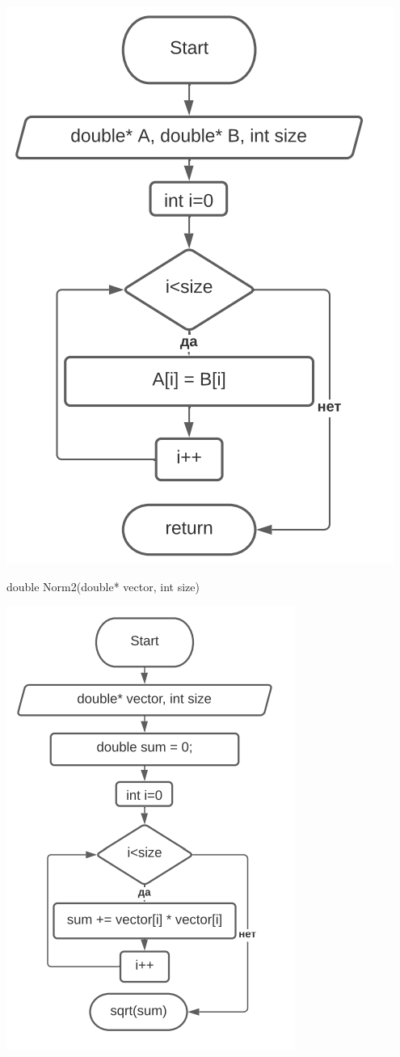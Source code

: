 \includegraphics[scale=0.6]{block7.png}

double Norm2(double* vector, int size)

\includegraphics[scale=0.7]{block8.png}

